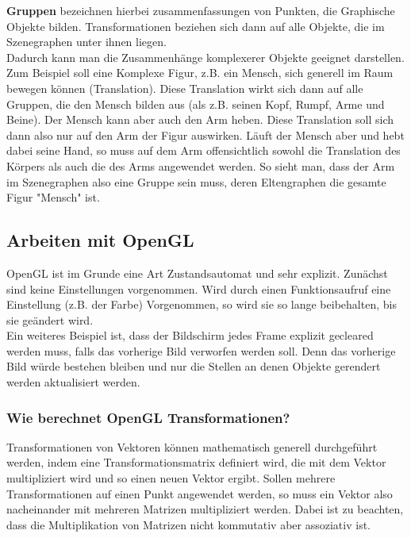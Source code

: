 \textbf{Gruppen} bezeichnen hierbei zusammenfassungen von Punkten, die Graphische Objekte bilden. Transformationen beziehen sich dann auf alle Objekte, die im Szenegraphen unter ihnen liegen.\\
Dadurch kann man die Zusammenhänge komplexerer Objekte geeignet darstellen. Zum Beispiel soll eine Komplexe Figur, z.B. ein Mensch, sich generell im Raum bewegen können (Translation). Diese Translation wirkt sich dann auf alle Gruppen, die den Mensch bilden aus (als z.B. seinen Kopf, Rumpf, Arme und Beine). Der Mensch kann aber auch den Arm heben. Diese Translation soll sich dann also nur auf den Arm der Figur auswirken. Läuft der Mensch aber und hebt dabei seine Hand, so muss auf dem Arm offensichtlich sowohl die Translation des Körpers als auch die des Arms angewendet werden. So sieht man, dass der Arm im Szenegraphen also eine Gruppe sein muss, deren Eltengraphen die gesamte Figur "Mensch" ist.

\subsection{Arbeiten mit OpenGL}
OpenGL ist im Grunde eine Art Zustandsautomat und sehr explizit. Zunächst sind keine Einstellungen vorgenommen. Wird durch einen Funktionsaufruf eine Einstellung (z.B. der Farbe) Vorgenommen, so wird sie so lange beibehalten, bis sie geändert wird.\\
Ein weiteres Beispiel ist, dass der Bildschirm jedes Frame explizit gecleared werden muss, falls das vorherige Bild verworfen werden soll. Denn das vorherige Bild würde bestehen bleiben und nur die Stellen an denen Objekte gerendert werden aktualisiert werden.\\

\subsubsection*{Wie berechnet OpenGL Transformationen?}
Transformationen von Vektoren können mathematisch generell durchgeführt werden, indem eine Transformationsmatrix definiert wird, die mit dem Vektor multipliziert wird und so einen neuen Vektor ergibt. Sollen mehrere Transformationen auf einen Punkt angewendet werden, so muss ein Vektor also nacheinander mit mehreren Matrizen multipliziert werden. Dabei ist zu beachten, dass die Multiplikation von Matrizen nicht kommutativ aber assoziativ ist.\\

